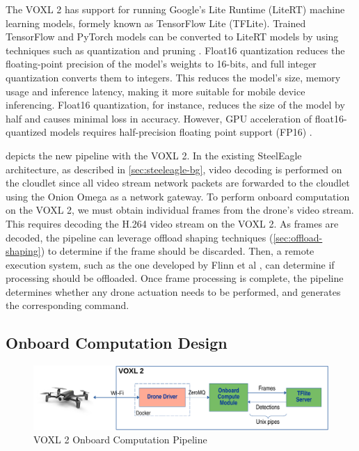The VOXL 2 has support for running Google's Lite Runtime (LiteRT) machine
learning models, formely known as TensorFlow Lite (TFLite). Trained TensorFlow
and PyTorch models can be converted to LiteRT models by using techniques such
as quantization and pruning \cite{jacob2017}. Float16 quantization reduces the
floating-point precision of the model's weights to 16-bits, and full integer
quantization converts them to integers. This reduces the model's size, memory
usage and inference latency, making it more suitable for mobile device
inferencing. Float16 quantization, for instance, reduces the size of the model
by half and causes minimal loss in accuracy. However, GPU acceleration of
float16-quantized models requires half-precision floating point support (FP16)
\cite{ho2017}.

 depicts the new pipeline with the VOXL 2.
In the existing SteelEagle architecture, as described in
\cref{sec:steeleagle-bg}, video decoding is performed on the cloudlet since all
video stream network packets are forwarded to the cloudlet using the Onion
Omega as a network gateway. To perform onboard computation on the VOXL 2, we
must obtain individual frames from the drone's video stream.  This requires
decoding the H.264 video stream on the VOXL 2. As frames are decoded, the
pipeline can leverage offload shaping techniques (\cref{sec:offload-shaping})
to determine if the frame should be discarded. Then, a remote execution system,
such as the one developed by Flinn et al \cite{flinn2002}, can determine if
processing should be offloaded. Once frame processing is complete, the pipeline
determines whether any drone actuation needs to be performed, and generates the
corresponding command.

\subsection{Onboard Computation Design}

\begin{figure}[htbp]
\centerline{\includegraphics[width = .9\textwidth]{figs/onboard-design-crop.pdf}}
\caption{VOXL 2 Onboard Computation Pipeline}
\label{fig:voxl2-onboard-pipeline}
\end{figure}


